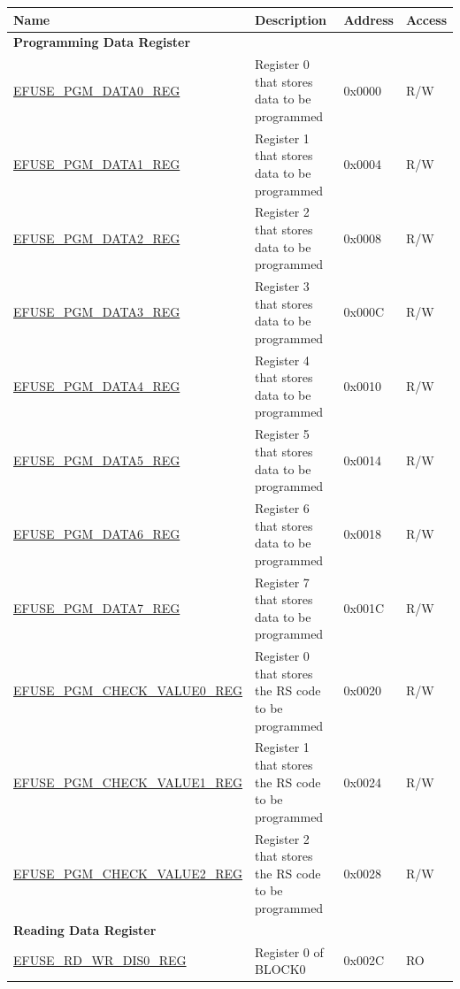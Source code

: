 \begin{longtable}{ | p{6.8cm} | p{7cm} | p{1.3cm} | p{1.2cm} | }
    \hline\rowcolor{lightgray}
    Name & Description &  Address & Access \\ \hline
    \endhead
    \multicolumn{4}{|l|}{\textbf{Programming Data Register}} \\ \hline
    \hyperref[regdesc:EFUSEPGMDATANREG]{EFUSE\_PGM\_DATA0\_REG} & Register 0 that stores data to be programmed & 0x0000 & R/W \\ \hline
    \hyperref[regdesc:EFUSEPGMDATANREG]{EFUSE\_PGM\_DATA1\_REG} & Register 1 that stores data to be programmed & 0x0004 & R/W \\ \hline
    \hyperref[regdesc:EFUSEPGMDATANREG]{EFUSE\_PGM\_DATA2\_REG} & Register 2 that stores data to be programmed & 0x0008 & R/W \\ \hline
    \hyperref[regdesc:EFUSEPGMDATANREG]{EFUSE\_PGM\_DATA3\_REG} & Register 3 that stores data to be programmed & 0x000C & R/W \\ \hline
    \hyperref[regdesc:EFUSEPGMDATANREG]{EFUSE\_PGM\_DATA4\_REG} & Register 4 that stores data to be programmed & 0x0010 & R/W \\ \hline
    \hyperref[regdesc:EFUSEPGMDATANREG]{EFUSE\_PGM\_DATA5\_REG} & Register 5 that stores data to be programmed & 0x0014 & R/W \\ \hline
    \hyperref[regdesc:EFUSEPGMDATANREG]{EFUSE\_PGM\_DATA6\_REG} & Register 6 that stores data to be programmed & 0x0018 & R/W \\ \hline
    \hyperref[regdesc:EFUSEPGMDATANREG]{EFUSE\_PGM\_DATA7\_REG} & Register 7 that stores data to be programmed & 0x001C & R/W \\ \hline
    \hyperref[regdesc:EFUSEPGMCHECKVALUENREG]{EFUSE\_PGM\_CHECK\_VALUE0\_REG} & Register 0 that stores the RS code to be programmed & 0x0020 & R/W \\ \hline
    \hyperref[regdesc:EFUSEPGMCHECKVALUENREG]{EFUSE\_PGM\_CHECK\_VALUE1\_REG} & Register 1 that stores the RS code to be programmed & 0x0024 & R/W \\ \hline
    \hyperref[regdesc:EFUSEPGMCHECKVALUENREG]{EFUSE\_PGM\_CHECK\_VALUE2\_REG} & Register 2 that stores the RS code to be programmed & 0x0028 & R/W \\ \hline
    \multicolumn{4}{|l|}{\textbf{Reading Data Register}} \\ \hline
    \hyperref[regdesc:EFUSERDWRDIS0REG]{EFUSE\_RD\_WR\_DIS0\_REG} & Register 0 of BLOCK0 & 0x002C & RO \\ \hline

\end{longtable}
